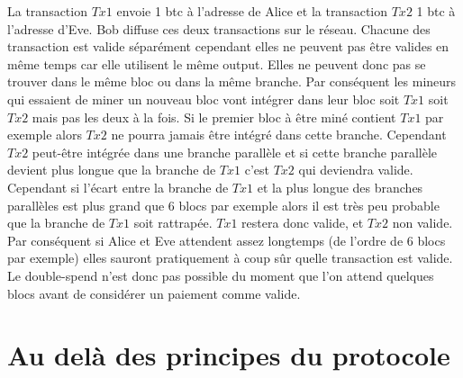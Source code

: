 \documentclass[11pt,a4paper]{article}
\begin{document}
La transaction $Tx1$ envoie 1 btc à l'adresse de Alice et la transaction $Tx2$ 1 btc à l'adresse d'Eve. Bob diffuse ces deux transactions sur le réseau. Chacune des transaction est valide séparément cependant elles ne peuvent pas être valides en même temps car elle utilisent le même output. Elles ne peuvent donc pas se trouver dans le même bloc ou dans la même branche. Par conséquent les mineurs qui essaient de miner un nouveau bloc vont intégrer dans leur bloc soit $Tx1$ soit $Tx2$ mais pas les deux à la fois. Si le premier bloc à être miné contient $Tx1$ par exemple alors $Tx2$ ne pourra jamais être intégré dans cette branche. Cependant $Tx2$ peut-être intégrée dans une branche parallèle et si cette branche parallèle devient plus longue que la branche de $Tx1$ c'est $Tx2$ qui deviendra valide. Cependant si l'écart entre la branche de $Tx1$ et la plus longue des branches parallèles est plus grand que 6 blocs par exemple alors il est très peu probable que la branche de $Tx1$ soit rattrapée. $Tx1$ restera donc valide, et $Tx2$ non valide. Par conséquent si Alice et Eve attendent assez longtemps (de l'ordre de 6 blocs par exemple) elles sauront pratiquement à coup sûr quelle transaction est valide. Le double-spend n'est donc pas possible du moment que l'on attend quelques blocs avant de considérer un paiement comme valide.

\section{Au delà des principes du protocole}
\end{document}

